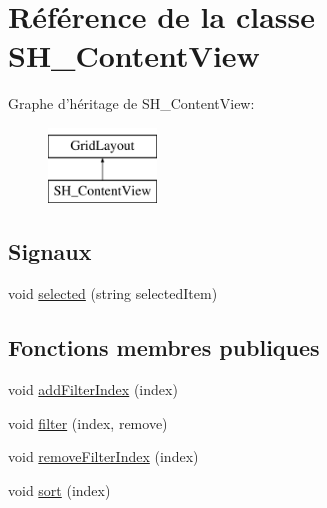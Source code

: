 \hypertarget{classSH__ContentView}{\section{Référence de la classe S\-H\-\_\-\-Content\-View}
\label{classSH__ContentView}
}
Graphe d'héritage de S\-H\-\_\-\-Content\-View\-:\begin{figure}[H]
\begin{center}
\leavevmode
\includegraphics[height=2.000000cm]{classSH__ContentView}
\end{center}
\end{figure}
\subsection*{Signaux}
\begin{DoxyCompactItemize}
\item 
void \hyperlink{classSH__ContentView_a85c8e92ea6e076446a3b0415d758350f}{selected} (string selected\-Item)
\end{DoxyCompactItemize}
\subsection*{Fonctions membres publiques}
\begin{DoxyCompactItemize}
\item 
void \hyperlink{classSH__ContentView_ac6937d4b79d1b7fb205b69f6bd12c29f}{add\-Filter\-Index} (index)
\item 
void \hyperlink{classSH__ContentView_a281e67d2abc15c9e81895284717bce43}{filter} (index, remove)
\item 
void \hyperlink{classSH__ContentView_a9edbc3b09400eed69c0d6d5be1f40e39}{remove\-Filter\-Index} (index)
\item 
void \hyperlink{classSH__ContentView_a32bbe22a5ea495a3fdb935e1dcc97bba}{sort} (index)
\end{DoxyCompactItemize}
